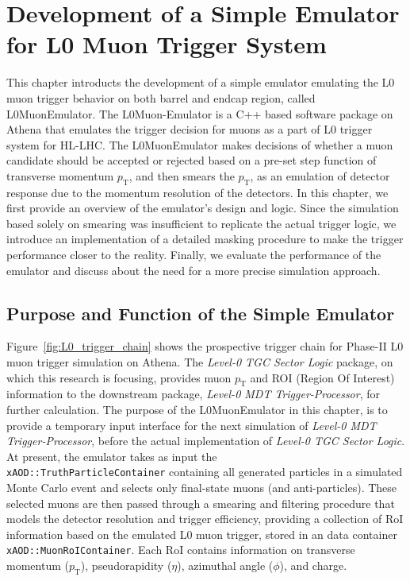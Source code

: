 \chapter{Development of a Simple Emulator for L0 Muon Trigger System} \label{ch:L0MuonEmulator}
This chapter introducts the development of a simple emulator emulating the L0 muon trigger behavior on both barrel and endcap region, called L0MuonEmulator. The L0Muon-Emulator is a C++ based software package on Athena that emulates the trigger decision for muons as a part of L0 trigger system for HL-LHC. The L0MuonEmulator makes decisions of whether a muon candidate should be accepted or rejected based on a pre-set step function of transverse momentum $p_\mathrm{T}$, and then smears the $p_\mathrm{T}$, as an emulation of detector response due to the momentum resolution of the detectors. In this chapter, we first provide an overview of the emulator's design and logic. Since the simulation based solely on smearing was insufficient to replicate the actual trigger logic, we introduce an implementation of a detailed masking procedure to make the trigger performance closer to the reality. Finally, we evaluate the performance of the emulator and discuss about the need for a more precise simulation approach.
\section{Purpose and Function of the Simple Emulator} \label{sec:L0MuonPurpose}
Figure~\ref{fig:L0_trigger_chain} shows the prospective trigger chain for Phase-II L0 muon trigger simulation on Athena. The \textit{Level-0 TGC Sector Logic} package, on which this research is focusing, provides muon $p_\mathrm{T}$ and ROI (Region Of Interest) information to the downstream package, \textit{Level-0 MDT Trigger-Processor}, for further calculation. The purpose of the L0MuonEmulator in this chapter, is to provide a temporary input interface for the next simulation of \textit{Level-0 MDT Trigger-Processor}, before the actual implementation of \textit{Level-0 TGC Sector Logic}. At present, the emulator takes as input the \\\texttt{xAOD::TruthParticleContainer} containing all generated particles in a simulated Monte Carlo event and selects only final-state muons (and anti-particles). These selected muons are then passed through a smearing and filtering procedure that models the detector resolution and trigger efficiency, providing a collection of RoI information based on the emulated L0 muon trigger, stored in an data container \texttt{xAOD::MuonRoIContainer}. Each RoI contains information on transverse momentum ($p_\mathrm{T}$), pseudorapidity ($\eta$), azimuthal angle ($\phi$), and charge.

